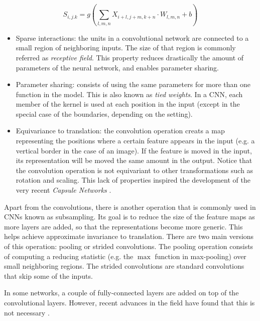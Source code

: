 \begin{equation}
\label{eq:cnnformula}
S_{i,j.k} = g\left(\sum_{l,m,n}{X_{i+l, j+m, k+n} \cdot W_{l,m,n} + b}\right)
\end{equation}

\begin{itemize}
	\item Sparse interactions: the units in a convolutional network are connected to a small region of neighboring inputs. The size of that region is commonly referred as \textit{receptive field}. This property reduces drastically the amount of parameters of the neural network, and enables parameter sharing.
	\item Parameter sharing: consists of using the same parameters for more than one function in the model. This is also known as \textit{tied weights}. In a CNN, each member of the kernel is used at each position in the input (except in the special case of the boundaries, depending on the setting). 
	\item Equivariance to translation: the convolution operation creats a map representing the positions where a certain feature appears in the input (e.g. a vertical border in the case of an image). If the feature is moved in the input, its representation will be moved the same amount in the output. Notice that the convolution operation is not equivariant to other transformations such as rotation and scaling. This lack of properties inspired the development of the very recent \textit{Capsule Networks} \cite{sabour2017}.
\end{itemize}

Apart from the convolutions, there is another operation that is commonly used in CNNs known as subsampling. Its goal is to reduce the size of the feature maps as more layers are added, so that the representations become more generic. This helps achieve approximate invariance to translation. There are two main versions of this operation: pooling or strided convolutions. The pooling operation \cite{Goodfellow2016} consists of computing a reducing statistic (e.g. the $\max$ function in max-pooling) over small neighboring regions. The strided convolutions \cite{riadh2020} are standard convolutions that skip some of the inputs.

In some networks, a couple of fully-connected layers are added on top of the convolutional layers. However, recent advances in the field have found that this is not necessary \cite{shelhamer2015}.



